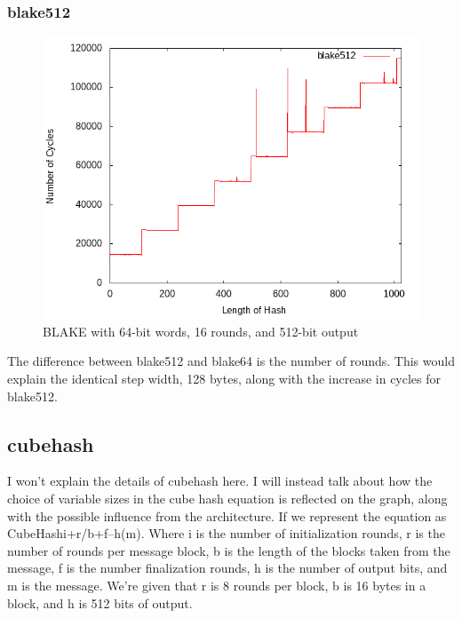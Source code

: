 \documentclass[10pt,a4paper]{article}
\begin{document}
\subsubsection{blake512}
    \begin{figure}[H]
        \begin{center}
            \includegraphics[scale=0.5]{images_fast_run/blake512.png} 
            \caption{BLAKE with 64-bit words, 16 rounds, and 512-bit output}
        \end{center}
    \end{figure}
The difference between blake512 and blake64 is the number of rounds. This would explain the identical step width, 128 bytes, along with the increase
in cycles for blake512. 

\subsection{cubehash}
I won't explain the details of cubehash here. I will instead talk about how the choice of variable sizes in the cube hash equation is reflected on the graph, along with the possible influence from the architecture. If we represent the equation as CubeHashi+r/b+f–h(m). Where i is the number of initialization rounds, r is the number of rounds per message block, b is the length of the blocks taken from the message, f is the number finalization rounds, h is the number of output bits, and m is the message. We're given that r is 8 rounds per block, b is 16 bytes in a block, and h is 512 bits of output.
\end{document}
